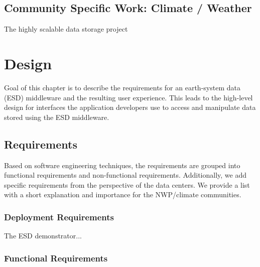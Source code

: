 \documentclass{../../template/esiwace-report}
\begin{document}
\section{Community Specific Work: Climate / Weather}

The highly scalable data storage project






\chapter{Design}

Goal of this chapter is to describe the requirements for an earth-system data (ESD) middleware and the resulting user experience.
This leads to the high-level design for interfaces the application developers use to access and manipulate data stored using the ESD middleware.

\section{Requirements}

Based on software engineering techniques, the requirements are grouped into functional requirements and non-functional requirements.
Additionally, we add specific requirements from the perspective of the data centers.
We provide a list with a short explanation and importance for the NWP/climate communities.

\subsection{Deployment Requirements}

The ESD demonstrator...



\subsection{Functional Requirements}

\end{document}
